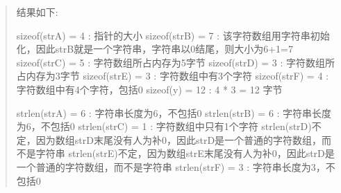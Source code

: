\documentclass[letterpaper,10pt,english]{sphinxmanual}
\begin{document}
\begin{enumerate}
\begin{quote}
%
\begin{sphinxVerbatim}[commandchars=\\\{\},numbers=left,firstnumber=1,stepnumber=1]
   
 \PYG{p}{[}\PYG{p}{]}  
 \PYG{p}{[}\PYG{p}{]}  
 \PYG{p}{[}\PYG{p}{]}    
 \PYG{p}{[}\PYG{p}{]}    
 \PYG{p}{[}\PYG{p}{]}     
 \PYG{p}{[}\PYG{p}{]}  
\end{sphinxVerbatim}

结果如下:

%
\begin{sphinxVerbatim}[commandchars=\\\{\}]
sizeof(strA) = 4 : 指针的大小
sizeof(strB) = 7 : 该字符数组用字符串初始化，因此strB就是一个字符串，字符串以\PYGZsq{}\PYGZbs{}0\PYGZsq{}结尾，则大小为6+1=7
sizeof(strC) = 5 : 字符数组所占内存为5字节
sizeof(strD) = 3 : 字符数组所占内存为3字节
sizeof(strE) = 3 : 字符数组中有3个字符
sizeof(strF) = 4 : 字符数组中有4个字符，包括\PYGZsq{}\PYGZbs{}0\PYGZsq{}
sizeof(y) = 12 : 4 * 3 = 12 字节

strlen(strA) = 6 : 字符串长度为6，不包括\PYGZsq{}\PYGZbs{}0\PYGZsq{}
strlen(strB) = 6 : 字符串长度为6，不包括\PYGZsq{}\PYGZbs{}0\PYGZsq{}
strlen(strC) = 1 : 字符数组中只有1个字符
strlen(strD)不定，因为数组strD末尾没有人为补\PYGZsq{}\PYGZbs{}0\PYGZsq{}，因此strD是一个普通的字符数组，而不是字符串
strlen(strE)不定，因为数组strE末尾没有人为补\PYGZsq{}\PYGZbs{}0\PYGZsq{}，因此strD是一个普通的字符数组，而不是字符串
strlen(strF) = 3 : 字符串长度为3，不包括\PYGZsq{}\PYGZbs{}0\PYGZsq{}
\end{sphinxVerbatim}


\end{quote}
\end{enumerate}
\end{document}
